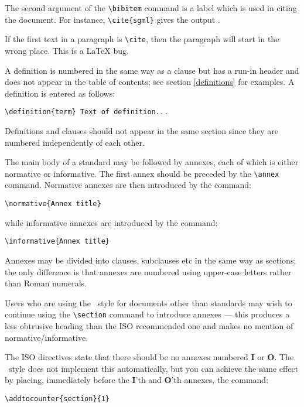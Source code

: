 The second argument of the \verb|\bibitem| command is a label which is used
in citing the document.
For instance, \verb|\cite{sgml}| gives the output \cite{sgml}.
\begin{note}
If the first text in a paragraph is \verb|\cite|, then the paragraph
will start in the wrong place.
This is a LaTeX bug.
\end{note}

\label{div.special.def}
A definition is numbered in the same way as a clause but has a run-in
header and does not appear in the table of contents; see section
\ref{definitions} for examples.
A definition is entered as follows:
\begin{verbatim}
\definition{term} Text of definition...
\end{verbatim}

\begin{note}
Definitions and clauses should not appear in the same section
since they are numbered independently of each other.
\end{note}

The main body of a standard may be followed by annexes, each of which is
either normative or informative.
The first annex should be preceded by the \verb|\annex| command.
Normative annexes are then introduced by the command:
\begin{verbatim}
\normative{Annex title}
\end{verbatim}
while informative annexes are introduced by the command:
\begin{verbatim}
\informative{Annex title}
\end{verbatim}

Annexes may be divided into clauses, subclauses etc in the same way as
sections; the only difference is that annexes are numbered using upper-case
letters rather than Roman numerals.
\begin{notes}
\item Users who are using the \iso\ style for documents other than standards may
wish to continue using the \verb|\section| command to introduce annexes ---
this produces a less obtrusive heading than the ISO recommended one and
makes no mention of normative/informative.
\item The ISO directives state that there should be no annexes numbered
{\bf I} or {\bf O}.
The \iso\ style does not implement this automatically, but you can achieve the
same effect by placing, immediately before the {\bf I}'th and {\bf O}'th
annexes, the command:
\begin{verbatim}
\addtocounter{section}{1}
\end{verbatim}
\end{notes}

